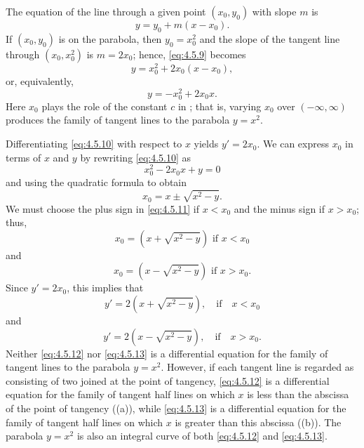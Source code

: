 \begin{alistSolution}
\item The equation of the line through a given point
$(x_0,y_0)$ with slope $m$ is
\begin{equation}  \label{eq:4.5.9}
y=y_0+m(x-x_0).
\end{equation}
If $(x_0,y_0)$ is on the parabola, then $y_0=x_0^2$ and the slope of
the tangent line through $(x_0,x_0^2)$ is $m=2x_0$; hence,
\eqref{eq:4.5.9} becomes
\[
y=x_0^2+2x_0(x-x_0),
\]
 or, equivalently,
\begin{equation} \label{eq:4.5.10}
y=-x_0^2+2x_0x.
\end{equation}
Here $x_0$ plays the role of the constant $c$ in
; that is, varying $x_0$ over
$(-\infty,\infty)$ produces the family of tangent lines to the
parabola $y=x^2$.

Differentiating \eqref{eq:4.5.10} with respect to $x$ yields
$y'=2x_0$.
We can express $x_0$ in terms of $x$ and $y$ by rewriting
\eqref{eq:4.5.10} as
\[
x_0^2-2x_0x+y=0
\]
and using the quadratic formula to obtain
\begin{equation}\label{eq:4.5.11}
 x_0=x\pm\sqrt{x^2-y}.
\end{equation}
We must choose the plus sign in \eqref{eq:4.5.11} if $x<x_0$
and the minus sign if $x>x_0$;   thus,
\[
x_0=\left(x+\sqrt{x^2-y}\right)\text{ if } x<x_0
\]
 and
\[
x_0=\left(x-\sqrt{x^2-y}\right)\text{ if } x>x_0.
\]
Since $y'=2x_0$, this implies that
\begin{equation} \label{eq:4.5.12}
y'=2\left(x+\sqrt{x^2-y}\right),\quad\text{if}\quad x<x_0
\end{equation}
 and
\begin{equation} \label{eq:4.5.13}
y'=2\left(x-\sqrt{x^2-y}\right),\quad\text{if}\quad x>x_0.
\end{equation}
Neither \eqref{eq:4.5.12} nor \eqref{eq:4.5.13} is a differential equation for
the family of tangent lines to the parabola $y=x^2$. However, if each
tangent line is regarded as consisting of two  joined at the point of tangency,   \eqref{eq:4.5.12} is a
differential equation for the family of tangent half lines on which
$x$ is less than the abscissa of the point of tangency
((a)), while \eqref{eq:4.5.13} is a
differential
equation for the family of tangent half lines on which $x$ is greater
than this abscissa ((b)). The
parabola $y=x^2$ is also an integral curve of both \eqref{eq:4.5.12} and
\eqref{eq:4.5.13}.


\end{alistSolution}
